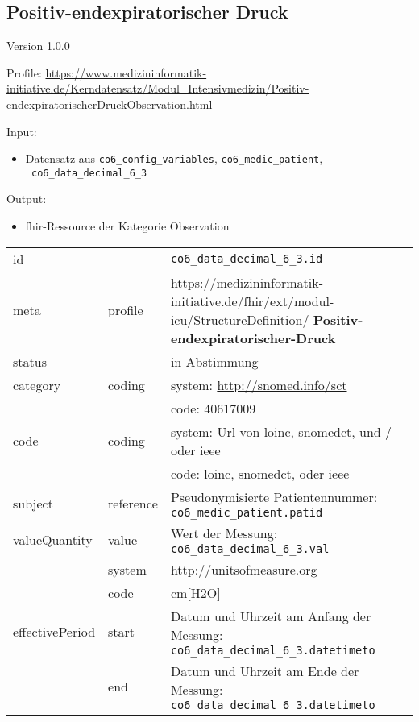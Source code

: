 \subsection{Positiv-endexpiratorischer Druck} 
\noindent Version 1.0.0

\noindent Profile: \url{https://www.medizininformatik-initiative.de/Kerndatensatz/Modul_Intensivmedizin/Positiv-endexpiratorischerDruckObservation.html}

\noindent Input:
\begin{itemize}
	\item Datensatz aus \texttt{co6\_config\_variables}, \texttt{co6\_medic\_patient}, \\ \texttt{
co6\_data\_decimal\_6\_3}
\end{itemize}
Output:
\begin{itemize}
        \item \ac{fhir}-Ressource der Kategorie \glqq Observation\grqq{}
\end{itemize}
\begin{longtable}{|l|l|p{7.5cm}|}
        \hline
        \rowcolor{lightgray} \multicolumn{3}{|l|}{Data Mapping (inhaltlich)} \\ \hline
        id &  & \texttt{co6\_data\_decimal\_6\_3.id} \\ \hline
	meta & profile & https://medizininformatik-initiative.de/fhir/ext/modul-icu/StructureDefinition/\textbf{
Positiv-endexpiratorischer-Druck} \\ \hline 
	status &  & in Abstimmung  \\ \hline 
	category & coding & system: \url{http://snomed.info/sct} \\
\cline{3-3}
	& & code: 40617009 \\ \hline
	code & coding & system: Url von \ac{loinc}, \ac{snomedct}, und / oder \ac{ieee} \\ 
	\cline{3-3} 
	 &  & code: \ac{loinc}, \ac{snomedct}, oder \ac{ieee} \\ \hline
	subject & reference & Pseudonymisierte Patientennummer: \texttt{co6\_medic\_patient.patid} \\ \hline
	valueQuantity & value & Wert der Messung: \texttt{co6\_data\_decimal\_6\_3.val} \\
        \cline{2-3}
         & system & http://unitsofmeasure.org \\
         \cline{2-3}
         & code & cm[H2O] \\ \hline
    effectivePeriod & start & Datum und Uhrzeit am Anfang der Messung: \texttt{
co6\_data\_decimal\_6\_3.datetimeto} \\
    \cline{2-3}
     & end & Datum und Uhrzeit am Ende der Messung: \texttt{
co6\_data\_decimal\_6\_3.datetimeto} \\ \hline
\end{longtable}


